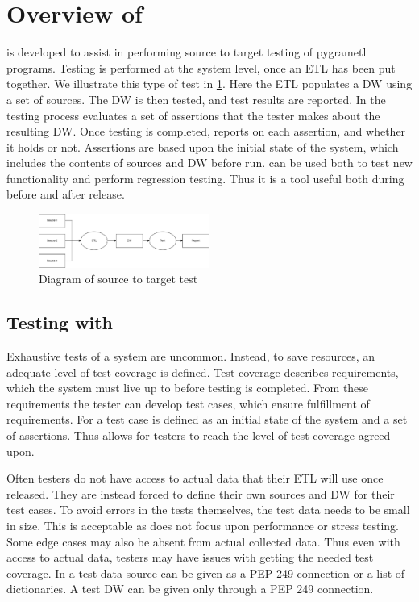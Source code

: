 \section{Overview of \FW{}}
\FW{} is developed to assist in performing source to target testing of pygrametl programs. Testing is performed at the system level, once an ETL has been put together. We illustrate this type of test in \cref{fig:sourcetotarget}. Here the ETL populates a DW using a set of sources. The DW is then tested, and test results are reported. In \FW{} the testing process evaluates a set of assertions that the tester makes about the resulting DW. Once testing is completed, \FW{} reports on each assertion, and whether it holds or not. Assertions are based upon the initial state of the system, which includes the contents of sources and DW before run. \FW{} can be used both to test new functionality and perform regression testing. Thus it is a tool useful both during before and after release. 

\begin{figure}
\centering
\includegraphics[width=0.5\textwidth]{figures/scenario.pdf}
\caption{Diagram of source to target test}
\label{fig:sourcetotarget}
\end{figure}

\subsection{Testing with \FW{}}
Exhaustive tests of a system are uncommon. Instead, to save resources, an adequate level of test coverage is defined. Test coverage describes requirements, which the system must live up to before testing is completed. From these requirements the tester can develop test cases, which ensure fulfillment of requirements. For \FW{} a test case is defined as an initial state of the system and a set of assertions. Thus \FW{} allows for testers to reach the level of test coverage agreed upon.

Often testers do not have access to actual data that their ETL will use once released. They are instead forced to define their own sources and DW  for their test cases. To avoid errors in the tests themselves, the test data needs to be small in size. This is acceptable as \FW{} does not focus upon  performance or stress testing. Some edge cases may also be absent from actual collected data. Thus even with access to actual data, testers may have issues with getting the needed test coverage. In \FW{} a test data source can be given as a  PEP 249 connection or a list of dictionaries. A test DW can be given only through a PEP 249 connection. 

